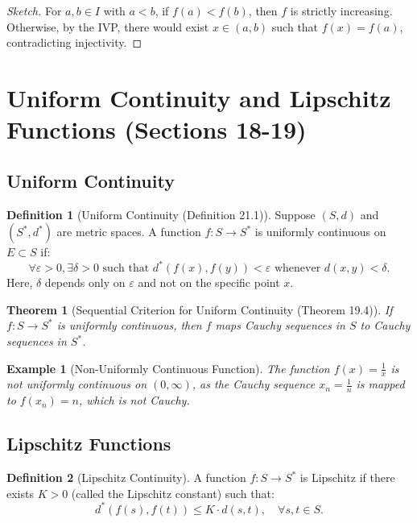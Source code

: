\documentclass[9pt]{article}
\theoremstyle{definition}
\newtheorem{definition}{Definition}
\theoremstyle{plain}
\newtheorem{theorem}{Theorem}
\newtheorem{example}{Example}
\begin{document}
\begin{proof}[Sketch]
For \( a, b \in I \) with \( a < b \), if \( f(a) < f(b) \), then \( f \) is strictly increasing. Otherwise, by the IVP, there would exist \( x \in (a, b) \) such that \( f(x) = f(a) \), contradicting injectivity.
\end{proof}
\section*{Uniform Continuity and Lipschitz Functions (Sections 18-19)}

\subsection*{Uniform Continuity}
\begin{definition}[Uniform Continuity (Definition 21.1)]
Suppose \( (S, d) \) and \( (S^*, d^*) \) are metric spaces. A function \( f : S \to S^* \) is uniformly continuous on \( E \subset S \) if:
\[
\forall \varepsilon > 0, \exists \delta > 0 \text{ such that } d^*(f(x), f(y)) < \varepsilon \text{ whenever } d(x, y) < \delta.
\]
Here, \( \delta \) depends only on \( \varepsilon \) and not on the specific point \( x \).
\end{definition}

\begin{theorem}[Sequential Criterion for Uniform Continuity (Theorem 19.4)]
If \( f : S \to S^* \) is uniformly continuous, then \( f \) maps Cauchy sequences in \( S \) to Cauchy sequences in \( S^* \).
\end{theorem}

\begin{example}[Non-Uniformly Continuous Function]
The function \( f(x) = \frac{1}{x} \) is not uniformly continuous on \( (0, \infty) \), as the Cauchy sequence \( x_n = \frac{1}{n} \) is mapped to \( f(x_n) = n \), which is not Cauchy.
\end{example}

\subsection*{Lipschitz Functions}
\begin{definition}[Lipschitz Continuity]
A function \( f : S \to S^* \) is Lipschitz if there exists \( K > 0 \) (called the Lipschitz constant) such that:
\[
d^*(f(s), f(t)) \leq K \cdot d(s, t), \quad \forall s, t \in S.
\]
\end{definition}
\end{document}
